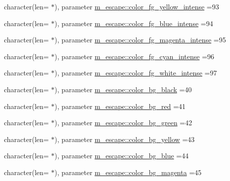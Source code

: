 \begin{DoxyCompactItemize}
\item 
character(len= $\ast$), parameter \mbox{\hyperlink{namespacem__escape_a7fb2b231cf28bd2ffbf015d7430b46db}{m\+\_\+escape\+::color\+\_\+fg\+\_\+yellow\+\_\+intense}} =\textquotesingle{}93\textquotesingle{}
\item 
character(len= $\ast$), parameter \mbox{\hyperlink{namespacem__escape_a57cc52b1beef27fae861cae6448221fe}{m\+\_\+escape\+::color\+\_\+fg\+\_\+blue\+\_\+intense}} =\textquotesingle{}94\textquotesingle{}
\item 
character(len= $\ast$), parameter \mbox{\hyperlink{namespacem__escape_ac47d36c6fed693f69eff29d0046c8f20}{m\+\_\+escape\+::color\+\_\+fg\+\_\+magenta\+\_\+intense}} =\textquotesingle{}95\textquotesingle{}
\item 
character(len= $\ast$), parameter \mbox{\hyperlink{namespacem__escape_a58a755722e6672a1fe8ef98637540105}{m\+\_\+escape\+::color\+\_\+fg\+\_\+cyan\+\_\+intense}} =\textquotesingle{}96\textquotesingle{}
\item 
character(len= $\ast$), parameter \mbox{\hyperlink{namespacem__escape_ac0eb5968bfff3dfa064ec28b5218b2bf}{m\+\_\+escape\+::color\+\_\+fg\+\_\+white\+\_\+intense}} =\textquotesingle{}97\textquotesingle{}
\item 
character(len= $\ast$), parameter \mbox{\hyperlink{namespacem__escape_a5e4fc9941494a5c9518c84b434bfc97b}{m\+\_\+escape\+::color\+\_\+bg\+\_\+black}} =\textquotesingle{}40\textquotesingle{}
\item 
character(len= $\ast$), parameter \mbox{\hyperlink{namespacem__escape_ad219a6232dbaeb100a6e6cdc0365ee22}{m\+\_\+escape\+::color\+\_\+bg\+\_\+red}} =\textquotesingle{}41\textquotesingle{}
\item 
character(len= $\ast$), parameter \mbox{\hyperlink{namespacem__escape_a7c50b2b50909acf5935f9de7642d30f3}{m\+\_\+escape\+::color\+\_\+bg\+\_\+green}} =\textquotesingle{}42\textquotesingle{}
\item 
character(len= $\ast$), parameter \mbox{\hyperlink{namespacem__escape_a7bd0a1c173252170ccf6976b961fa1c3}{m\+\_\+escape\+::color\+\_\+bg\+\_\+yellow}} =\textquotesingle{}43\textquotesingle{}
\item 
character(len= $\ast$), parameter \mbox{\hyperlink{namespacem__escape_a699e7848c3c43f328168d59211d054cc}{m\+\_\+escape\+::color\+\_\+bg\+\_\+blue}} =\textquotesingle{}44\textquotesingle{}
\item 
character(len= $\ast$), parameter \mbox{\hyperlink{namespacem__escape_a73300e9f70a7abb1ec2a2bdb55194ae5}{m\+\_\+escape\+::color\+\_\+bg\+\_\+magenta}} =\textquotesingle{}45\textquotesingle{}

\end{DoxyCompactItemize}
